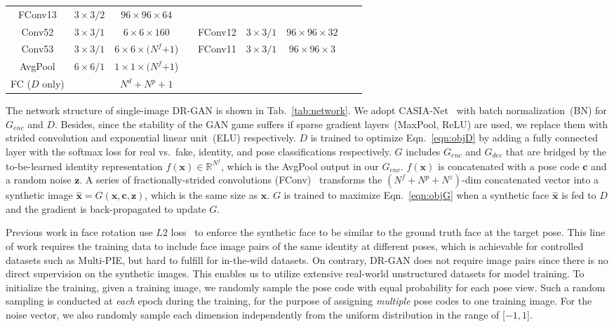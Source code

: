 \documentclass[10pt,journal,compsoc]{IEEEtran}
\begin{document}
\begin{table}[t!]
\begin{center}
{\begin{tabular}{ @{}ccccccccc@{} }
FConv13& $3\times3/2$ & $96\times96\times64$ \\ 
Conv52 & $3\times3/1$ & $6\times6\times160$ && FConv12& $3\times3/1$ & $96\times96\times32$ \\
Conv53 & $3\times3/1$ & $6\times6\times(N^f${\color{blue}$+1$}) && FConv11& $3\times3/1$ & $96\times96\times3$ \\
\midrule
AvgPool& $6\times6/1$ & $1\times1\times(N^f${\color{blue}$+1$}) && \\ \midrule
FC ($D$ only) && $N^d+N^p+1$ \\ \bottomrule
\end{tabular}}\figvspace 
\end{center}
\end{table}

The network structure of single-image DR-GAN is shown in Tab.~\ref{tab:network}.
We adopt CASIA-Net~\cite{yi2014learning} with batch normalization~(BN) for $G_{enc}$ and $D$. Besides, since the stability of the GAN game suffers if sparse gradient layers~(MaxPool, ReLU) are used, we replace them with  strided convolution and exponential linear unit~(ELU) respectively.
$D$ is trained to optimize Eqn.~\ref{eqn:objD} by adding a fully connected layer with the softmax loss for real vs.~fake, identity, and pose classifications respectively. 
$G$ includes $G_{enc}$ and $G_{dec}$ that are bridged by the to-be-learned identity representation $f(\mathbf{x})\in \mathbb{R}^{N^f}$, which is the AvgPool output in our $G_{enc}$.
$f(\mathbf{x})$ is concatenated with a pose code $\mathbf{c}$ and a random noise $\mathbf{z}$. 
A series of fractionally-strided convolutions (FConv)~\cite{radford2015unsupervised}
transforms the $(N^f+N^p+N^z)$-dim concatenated vector into a synthetic image $\hat{\mathbf{x}} = G(\mathbf{x}, \mathbf{c}, \mathbf{z})$, which is the same size as $\mathbf{x}$. 
$G$ is trained to maximize Eqn.~\ref{eqn:objG} when a synthetic face $\hat{\mathbf{x}}$ is fed to $D$ and the gradient is back-propagated to update $G$. 

Previous work in face rotation use $L2$ loss~\cite{zhu2014multi,yim2015rotating} to enforce the synthetic face to be similar to the ground truth face at the target pose.
This line of work requires the training data to include face image pairs of the same identity at different poses, which is achievable for controlled datasets such as Multi-PIE, but hard to fulfill for in-the-wild datasets. 
On contrary, DR-GAN does not require image pairs since there is no direct supervision on the synthetic images. 
This enables us to utilize extensive real-world unstructured datasets for model training. 
To initialize the training, given a training image, we randomly sample the pose code with equal probability for each pose view. 
Such a random sampling is conducted at {\it each} epoch during the training, for the purpose of assigning  {\it multiple} pose codes to one training image.
For the noise vector, we also randomly sample each dimension independently from the uniform distribution in the range of [$-1,1$].
\end{document}
